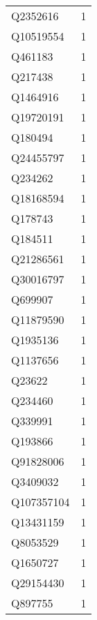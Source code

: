 \begin{tabular}{lr}
    Q2352616 &                             1 \\
   Q10519554 &                             1 \\
     Q461183 &                             1 \\
     Q217438 &                             1 \\
    Q1464916 &                             1 \\
   Q19720191 &                             1 \\
     Q180494 &                             1 \\
   Q24455797 &                             1 \\
     Q234262 &                             1 \\
   Q18168594 &                             1 \\
     Q178743 &                             1 \\
     Q184511 &                             1 \\
   Q21286561 &                             1 \\
   Q30016797 &                             1 \\
     Q699907 &                             1 \\
   Q11879590 &                             1 \\
    Q1935136 &                             1 \\
    Q1137656 &                             1 \\
      Q23622 &                             1 \\
     Q234460 &                             1 \\
     Q339991 &                             1 \\
     Q193866 &                             1 \\
   Q91828006 &                             1 \\
    Q3409032 &                             1 \\
  Q107357104 &                             1 \\
   Q13431159 &                             1 \\
    Q8053529 &                             1 \\
    Q1650727 &                             1 \\
   Q29154430 &                             1 \\
     Q897755 &                             1 \\

\end{tabular}

